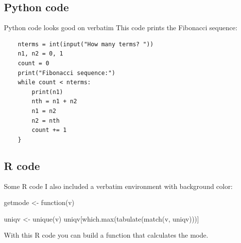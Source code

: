 \subsection{Python code}

\begin{frame}[fragile]{Python code looks good on verbatim}
	This code prints the Fibonacci sequence:
	\begin{verbatim}
	nterms = int(input("How many terms? "))
	n1, n2 = 0, 1
	count = 0
	print("Fibonacci sequence:")
	while count < nterms:
	    print(n1)
	    nth = n1 + n2
	    n1 = n2
	    n2 = nth
	    count += 1
	}
	\end{verbatim}
\end{frame}

\subsection{R code}

\begin{frame}[fragile]{Some R code}
I also included a verbatim environment with background color:
	\begin{cverbatim}
getmode <- function(v) {
  uniqv <- unique(v)
  uniqv[which.max(tabulate(match(v, uniqv)))]
  
}
	\end{cverbatim}
	With this R code you can build a function that calculates the mode.
\end{frame}



















